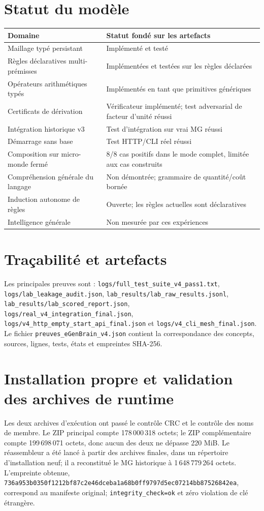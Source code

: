 \documentclass[11pt,a4paper]{book}
\begin{document}
\chapter{Statut du modèle}
\begin{longtable}{p{}p{}}
\toprule
Domaine & Statut fondé sur les artefacts \\
\midrule
Maillage typé persistant & Implémenté et testé \\
Règles déclaratives multi-prémisses & Implémentées et testées sur les règles déclarées \\
Opérateurs arithmétiques typés & Implémentés en tant que primitives génériques \\
Certificats de dérivation & Vérificateur implémenté; test adversarial de facteur d'unité réussi \\
Intégration historique v3 & Test d'intégration sur vrai MG réussi \\
Démarrage sans base & Test HTTP/CLI réel réussi \\
Composition sur micro-monde fermé & 8/8 cas positifs dans le mode complet, limitée aux cas construits \\
Compréhension générale du langage & Non démontrée; grammaire de quantité/coût bornée \\
Induction autonome de règles & Ouverte; les règles actuelles sont déclaratives \\
Intelligence générale & Non mesurée par ces expériences \\
\bottomrule
\end{longtable}

\chapter{Traçabilité et artefacts}
Les principales preuves sont : \texttt{logs/full\_test\_suite\_v4\_pass1.txt}, \texttt{logs/lab\_leakage\_audit.json}, \texttt{lab\_results/lab\_raw\_results.jsonl}, \texttt{lab\_results/lab\_scored\_report.json}, \texttt{logs/real\_v4\_integration\_final.json}, \texttt{logs/v4\_http\_empty\_start\_api\_final.json} et \texttt{logs/v4\_cli\_mesh\_final.json}. Le fichier \texttt{preuves\_eGenBrain\_v4.json} contient la correspondance des concepts, sources, lignes, tests, états et empreintes SHA-256.



\chapter{Installation propre et validation des archives de runtime}
Les deux archives d'exécution ont passé le contrôle CRC et le contrôle des noms de membre. Le ZIP principal compte 178\,000\,318 octets; le ZIP complémentaire compte 199\,698\,071 octets, donc aucun des deux ne dépasse 220 MiB. Le réassembleur a été lancé à partir des archives finales, dans un répertoire d'installation neuf; il a reconstitué le MG historique à 1\,648\,779\,264 octets. L'empreinte obtenue, \texttt{736a953b0350f121\allowbreak{}2bf87c2e46dceba1\allowbreak{}a68b0ff9797d5ec0\allowbreak{}7214bb87526842ea}, correspond au manifeste original; \texttt{integrity\_check=ok} et zéro violation de clé étrangère.
\end{document}
